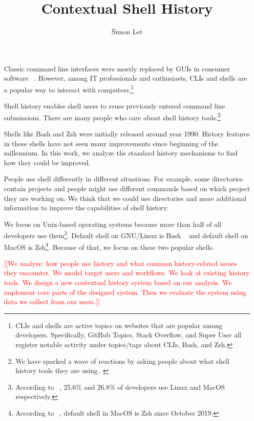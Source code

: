 \documentclass[thesis=M,english]{FITthesis}[2012/10/20]
\title{Contextual Shell History}
\author{Šimon Let} %
\newcommand{\redtext}[1]{\textcolor{red}{[[#1]]}}
\let\myCite\cite
\renewcommand\cite{\unskip~\myCite}
\begin{document}
\begin{introduction}



Classic command line interfaces were mostly replaced by GUIs in consumer software \cite{norman2007ui}. However, among IT professionals and enthusiasts, CLIs and shells are a popular way to interact with computers.\footnote{CLIs and shells are active topics on websites that are popular among developers. Specifically, GitHub Topics, Stack Overflow, and Super User all register notable activity under topics/tags about CLIs, Bash, and Zsh.} 

Shell history enables shell users to reuse previously entered command line submissions.
There are many people who care about shell history tools.\footnote{We have sparked a wave of reactions by asking people about what shell history tools they are using.\cite{twitter-thread}}

Shells like Bash and Zsh were initially released around year 1990. History features in these shells have not seen many improvements since beginning of the millennium. In this work, we analyze the standard history mechanisms to find how they could be improved.

People use shell differently in different situations. For example, some directories contain projects and people might use different commands based on which project they are working on. We think that we could use directories and more additional information to improve the capabilities of shell history. 

We focus on Unix-based operating systems because more than half of all developers use them\footnote{According to \cite{stackoverflow2019devsurvey}, 25.6\% and 26.8\% of developers use Linux and MacOS respectively.}. 
Default shell on GNU/Linux is Bash \cite{ramey1994gnubash} and default shell on MacOS is Zsh\footnote{According to \cite{apple2019zsh}, default shell in MacOS is Zsh since October 2019.}. Because of that, we focus on these two popular shells.

\redtext{We analyze: how people use history and what common history-related issues they encounter. We model target users and workflows. We look at existing history tools. We design a new contextual history system based on our analysis. We implement core parts of the designed system. Then we evaluate the system using data we collect from our users.}



\end{introduction}
\end{document}

